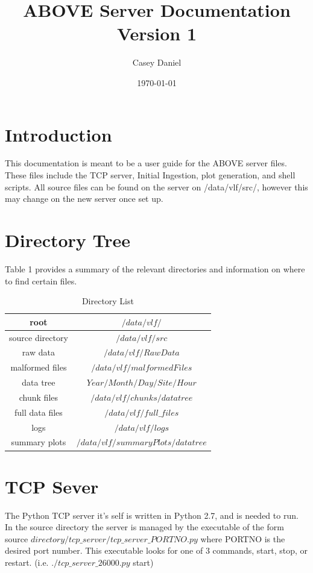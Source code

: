 \documentclass{article}
\title{ABOVE Server Documentation \\ Version 1}
\date{\today}
\author{Casey Daniel}
\begin{document}
\maketitle
\newpage 
\tableofcontents
\newpage
\section{Introduction}

This documentation is meant to be a user guide for the ABOVE server files. These files include the TCP server, Initial Ingestion, plot generation, and shell scripts. All source files can be found on the server on /data/vlf/src/, however this may change on the new server once set up. 


\section{Directory Tree}

Table 1 provides a summary of the relevant directories and information on where to find certain files.

\begin{table}[H]
\begin{tabular}{|c|c|} 
\hline
root & $/data/vlf/$ \\ \hline 
source directory & $/data/vlf/src$ \\ \hline
raw data & $/data/vlf/RawData$ \\ \hline
malformed files & $/data/vlf/malformedFiles$ \\ \hline
data tree & $Year/Month/Day/Site/Hour$ \\ \hline
chunk files & $/data/vlf/chunks/data tree$ \\ \hline
full data files & $/data/vlf/full\_ files$ \\ \hline
logs & $/data/vlf/logs$ \\ \hline
summary plots & $/data/vlf/summaryPlots/data tree$ \\ \hline
\end{tabular}
\label{table:directories}
\caption{Directory List}
\end{table}

\section{TCP Sever}
The Python TCP server it's self is written in Python 2.7, and is needed to run. In the source directory the server is managed by the executable of the form source $directory/tcp\_ server/tcp\_ server\_ PORTNO.py$ where PORTNO is the desired port number. This executable looks for one of 3 commands, start, stop, or restart. (i.e. $./tcp\_ server\_ 26000.py$ start)
\end{document}
